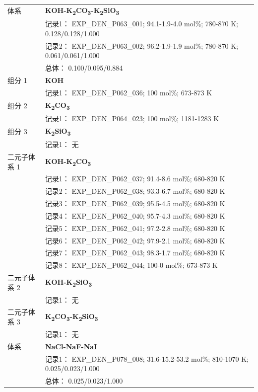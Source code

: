 \documentclass[12pt]{article}
\begin{document}
{\begin{longtable}[]{@{}
  >{\raggedright\arraybackslash}p{}
  >{\raggedright\arraybackslash}p{}@{}}
\midrule
体系 & \textbf{KOH-K\textsubscript{2}CO\textsubscript{3}-K\textsubscript{2}SiO\textsubscript{3}} \\
 & 记录1： EXP\_DEN\_P063\_001; 94.1-1.9-4.0 mol\%; 780-870 K; 0.128/0.128/1.000 \\
 & 记录2： EXP\_DEN\_P063\_002; 96.2-1.9-1.9 mol\%; 780-870 K; 0.061/0.061/1.000 \\
 & 总体： 0.100/0.095/0.884  \\

组分 1  & \textbf{KOH} \\
 & 记录1： EXP\_DEN\_P062\_036; 100 mol\%; 673-873 K  \\

组分 2  & \textbf{K\textsubscript{2}CO\textsubscript{3}} \\
 & 记录1： EXP\_DEN\_P064\_023; 100 mol\%; 1181-1283 K  \\

组分 3 & \textbf{K\textsubscript{2}SiO\textsubscript{3}} \\
 & 记录1： 无 \\
二元子体系 1  & \textbf{KOH-K\textsubscript{2}CO\textsubscript{3}} \\
 & 记录1： EXP\_DEN\_P062\_037; 91.4-8.6 mol\%; 680-820 K \\
 & 记录2： EXP\_DEN\_P062\_038; 93.3-6.7 mol\%; 680-820 K \\
 & 记录3： EXP\_DEN\_P062\_039; 95.5-4.5 mol\%; 680-820 K \\
 & 记录4： EXP\_DEN\_P062\_040; 95.7-4.3 mol\%; 680-820 K \\
 & 记录5： EXP\_DEN\_P062\_041; 97.2-2.8 mol\%; 680-820 K \\
 & 记录6： EXP\_DEN\_P062\_042; 97.9-2.1 mol\%; 680-820 K \\
 & 记录7： EXP\_DEN\_P062\_043; 98.3-1.7 mol\%; 680-820 K \\
 & 记录8： EXP\_DEN\_P062\_044; 100-0 mol\%; 673-873 K  \\

二元子体系 2 & \textbf{KOH-K\textsubscript{2}SiO\textsubscript{3}} \\
 & 记录1： 无 \\
二元子体系 3 & \textbf{K\textsubscript{2}CO\textsubscript{3}-K\textsubscript{2}SiO\textsubscript{3}} \\
 & 记录1： 无 \\
\midrule
体系 & \textbf{NaCl-NaF-NaI} \\
 & 记录1： EXP\_DEN\_P078\_008; 31.6-15.2-53.2 mol\%; 810-1070 K; 0.025/0.023/1.000 \\
 & 总体： 0.025/0.023/1.000  \\


\end{longtable}}
\end{document}
